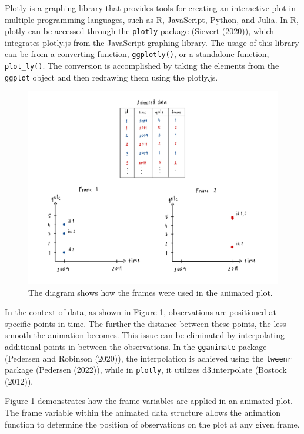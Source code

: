Plotly is a graphing library that provides tools for creating an interactive plot in multiple programming languages, such as R, JavaScript, Python, and Julia. In R, plotly can be accessed through the \texttt{plotly} package (Sievert (2020)), which integrates plotly.js from the JavaScript graphing library. The usage of this library can be from a converting function, \texttt{ggplotly()}, or a standalone function, \texttt{plot\_ly()}. The conversion is accomplished by taking the elements from the \texttt{ggplot} object and then redrawing them using the plotly.js.

\begin{figure}

{\centering \includegraphics[width=1\linewidth]{figures/animated-diagram} 

}

\caption{The diagram shows how the frames were used in the animated plot.}\label{fig:animated-diagram}
\end{figure}

In the context of data, as shown in Figure \ref{fig:animated-diagram}, observations are positioned at specific points in time. The further the distance between these points, the less smooth the animation becomes. This issue can be eliminated by interpolating additional points in between the observations. In the \texttt{gganimate} package (Pedersen and Robinson (2020)), the interpolation is achieved using the \texttt{tweenr} package (Pedersen (2022)), while in \texttt{plotly}, it utilizes d3.interpolate (Bostock (2012)).

Figure \ref{fig:animated-diagram} demonstrates how the frame variables are applied in an animated plot. The frame variable within the animated data structure allows the animation function to determine the position of observations on the plot at any given frame.

